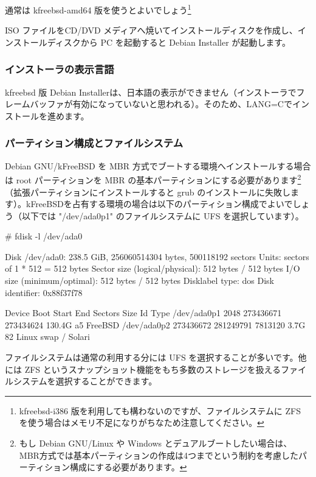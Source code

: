 \documentclass[mingoth,a4paper]{jsarticle}
\begin{document}
通常は kfreebsd-amd64 版を使うとよいでしょう\footnote{kfreebsd-i386 版を利用しても構わないのですが、ファイルシステムに ZFS を使う場合はメモリ不足になりがちなため注意してください。}

ISO ファイルをCD/DVD メディアへ焼いてインストールディスクを作成し、インストールディスクから PC を起動すると Debian Installer が起動します。


\subsubsection{インストーラの表示言語}

kfreebsd 版 Debian Installerは、日本語の表示ができません（インストーラでフレームバッファが有効になっていないと思われる）。そのため、LANG=Cでインストールを進めます。


\subsubsection{パーティション構成とファイルシステム}

Debian GNU/kFreeBSD を MBR 方式でブートする環境へインストールする場合は root パーティションを MBR の基本パーティションにする必要があります\footnote{もし Debian GNU/Linux や Windows とデュアルブートしたい場合は、MBR方式では基本パーティションの作成は4つまでという制約を考慮したパーティション構成にする必要があります。}（拡張パーティションにインストールすると grub のインストールに失敗します）。kFreeBSDを占有する環境の場合は以下のパーティション構成でよいでしょう（以下では "/dev/ada0p1" のファイルシステムに UFS を選択しています）。

\begin{commandline}
# fdisk -l /dev/ada0

Disk /dev/ada0: 238.5 GiB, 256060514304 bytes, 500118192 sectors
Units: sectors of 1 * 512 = 512 bytes
Sector size (logical/physical): 512 bytes / 512 bytes
I/O size (minimum/optimal): 512 bytes / 512 bytes
Disklabel type: dos
Disk identifier: 0x88f37f78

Device      Boot     Start       End   Sectors   Size Id Type
/dev/ada0p1           2048 273436671 273434624 130.4G a5 FreeBSD
/dev/ada0p2      273436672 281249791   7813120   3.7G 82 Linux swap / Solari
\end{commandline}

ファイルシステムは通常の利用する分には UFS を選択することが多いです。他には ZFS というスナップショット機能をもち多数のストレージを扱えるファイルシステムを選択することができます。
\end{document}
